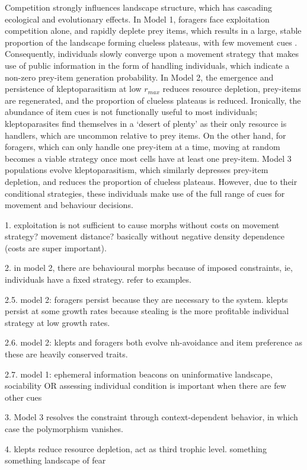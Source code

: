 \documentclass[11pt]{article}
\begin{document}
Competition strongly influences landscape structure, which has cascading ecological and evolutionary effects.
In Model 1, foragers face exploitation competition alone, and rapidly deplete prey items, which results in a large, stable proportion of the landscape forming clueless plateaus, with few movement cues \citep{perkins1992a}.
Consequently, individuals slowly converge upon a movement strategy that makes use of public information in the form of handling individuals, which indicate a non-zero prey-item generation probability.
In Model 2, the emergence and persistence of kleptoparasitism at low $r_{max}$ reduces resource depletion, prey-items are regenerated, and the proportion of clueless plateaus is reduced.
Ironically, the abundance of item cues is not functionally useful to most individuals; kleptoparasites find themselves in a `desert of plenty' as their only resource is handlers, which are uncommon relative to prey items.
On the other hand, for foragers, which can only handle one prey-item at a time, moving at random becomes a viable strategy once most cells have at least one prey-item.
Model 3 populations evolve kleptoparasitism, which similarly depresses prey-item depletion, and reduces the proportion of clueless plateaus.
However, due to their conditional strategies, these individuals make use of the full range of cues for movement and behaviour decisions.


1. exploitation is not sufficient to cause morphs without costs on movement strategy? movement distance? basically without negative density dependence (costs are super important).

2. in model 2, there are behavioural morphs because of imposed constraints, ie, individuals have a fixed strategy. refer to examples.

2.5. model 2: foragers persist because they are  necessary to the system. klepts persist at some growth rates because stealing is the more profitable individual strategy at low growth rates.

2.6. model 2: klepts and foragers both evolve nh-avoidance and item preference as these are heavily conserved traits.

2.7. model 1: ephemeral information beacons on uninformative landscape, sociability OR assessing individual condition is important when there are few other cues

3. Model 3 resolves the constraint through context-dependent behavior, in which case the polymorphism vanishes.

4. klepts reduce resource depletion, act as third trophic level.
something something landscape of fear
\end{document}
